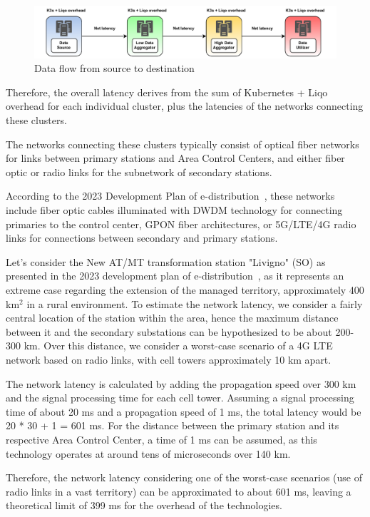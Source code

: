 \begin{figure}[ht]\centering
\includegraphics[scale=0.7]{Pictures/latency-schema}
\caption{Data flow from source to destination}\label{fig:latency}
\end{figure}

Therefore, the overall latency derives from the sum of Kubernetes + Liqo overhead for each individual cluster, plus the latencies of the networks connecting these clusters.

The networks connecting these clusters typically consist of optical fiber networks for links between primary stations and Area Control Centers, and either fiber optic or radio links for the subnetwork of secondary stations.

According to the 2023 Development Plan of e-distribution~\cite{e2-1}, these networks include fiber optic cables illuminated with DWDM technology for connecting primaries to the control center, GPON fiber architectures, or 5G/LTE/4G radio links for connections between secondary and primary stations.

Let's consider the New AT/MT transformation station "Livigno" (SO) as presented in the 2023 development plan of e-distribution~\cite{e2-2}, as it represents an extreme case regarding the extension of the managed territory, approximately 400 km$^2$ in a rural environment. To estimate the network latency, we consider a fairly central location of the station within the area, hence the maximum distance between it and the secondary substations can be hypothesized to be about 200-300 km. Over this distance, we consider a worst-case scenario of a 4G LTE network based on radio links, with cell towers approximately 10 km apart.

The network latency is calculated by adding the propagation speed over 300 km and the signal processing time for each cell tower. Assuming a signal processing time of about 20 ms and a propagation speed of 1 ms, the total latency would be 20 * 30 + 1 = 601 ms. For the distance between the primary station and its respective Area Control Center, a time of 1 ms can be assumed, as this technology operates at around tens of microseconds over 140 km.

Therefore, the network latency considering one of the worst-case scenarios (use of radio links in a vast territory) can be approximated to about 601 ms, leaving a theoretical limit of 399 ms for the overhead of the technologies.

